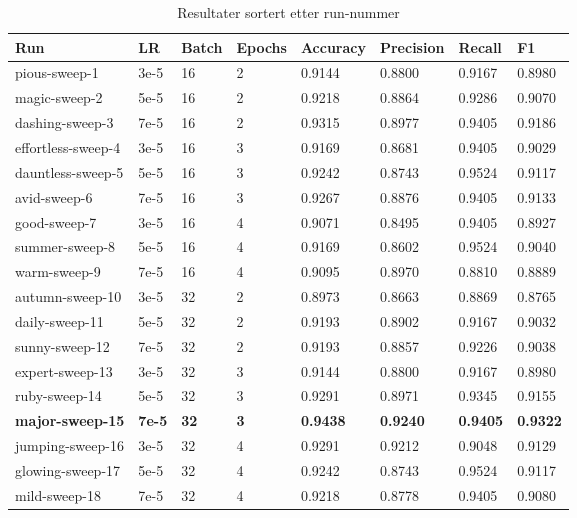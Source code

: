 \begin{table}
\caption{Resultater sortert etter run-nummer}
\label{tab:results}
\begin{tabular}{llllllll}
\toprule
Run & LR & Batch & Epochs & Accuracy & Precision & Recall & F1 \\
\midrule
pious-sweep-1 & 3e-5 & 16 & 2 & 0.9144 & 0.8800 & 0.9167 & 0.8980 \\
magic-sweep-2 & 5e-5 & 16 & 2 & 0.9218 & 0.8864 & 0.9286 & 0.9070 \\
dashing-sweep-3 & 7e-5 & 16 & 2 & 0.9315 & 0.8977 & 0.9405 & 0.9186 \\
effortless-sweep-4 & 3e-5 & 16 & 3 & 0.9169 & 0.8681 & 0.9405 & 0.9029 \\
dauntless-sweep-5 & 5e-5 & 16 & 3 & 0.9242 & 0.8743 & 0.9524 & 0.9117 \\
avid-sweep-6 & 7e-5 & 16 & 3 & 0.9267 & 0.8876 & 0.9405 & 0.9133 \\
good-sweep-7 & 3e-5 & 16 & 4 & 0.9071 & 0.8495 & 0.9405 & 0.8927 \\
summer-sweep-8 & 5e-5 & 16 & 4 & 0.9169 & 0.8602 & 0.9524 & 0.9040 \\
warm-sweep-9 & 7e-5 & 16 & 4 & 0.9095 & 0.8970 & 0.8810 & 0.8889 \\
autumn-sweep-10 & 3e-5 & 32 & 2 & 0.8973 & 0.8663 & 0.8869 & 0.8765 \\
daily-sweep-11 & 5e-5 & 32 & 2 & 0.9193 & 0.8902 & 0.9167 & 0.9032 \\
sunny-sweep-12 & 7e-5 & 32 & 2 & 0.9193 & 0.8857 & 0.9226 & 0.9038 \\
expert-sweep-13 & 3e-5 & 32 & 3 & 0.9144 & 0.8800 & 0.9167 & 0.8980 \\
ruby-sweep-14 & 5e-5 & 32 & 3 & 0.9291 & 0.8971 & 0.9345 & 0.9155 \\
\textbf{major-sweep-15} & \textbf{7e-5} & \textbf{32} & \textbf{3} & \textbf{0.9438} & \textbf{0.9240} & \textbf{0.9405} & \textbf{0.9322} \\
jumping-sweep-16 & 3e-5 & 32 & 4 & 0.9291 & 0.9212 & 0.9048 & 0.9129 \\
glowing-sweep-17 & 5e-5 & 32 & 4 & 0.9242 & 0.8743 & 0.9524 & 0.9117 \\
mild-sweep-18 & 7e-5 & 32 & 4 & 0.9218 & 0.8778 & 0.9405 & 0.9080 \\
\bottomrule
\end{tabular}
\end{table}
